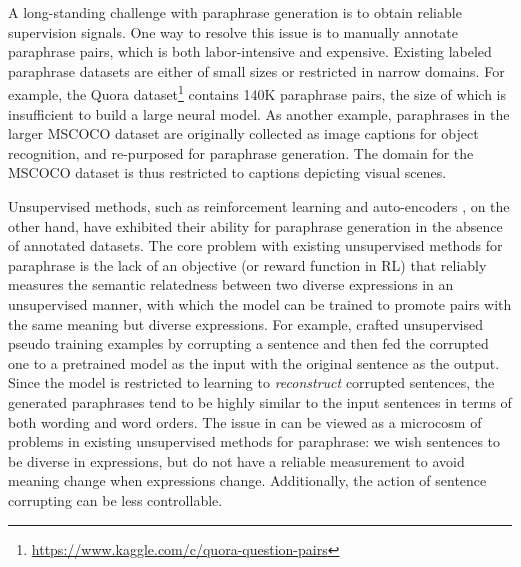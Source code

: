 \documentclass[11pt,a4paper]{article}
\begin{document}
A long-standing challenge with paraphrase generation is to obtain
 reliable supervision signals.
One way to resolve this issue is  to manually annotate paraphrase pairs, which is both labor-intensive and expensive. Existing labeled paraphrase datasets \citep{lin2014microsoft,fader-etal-2013-paraphrase,lan-etal-2017-continuously} are 
either of small sizes or  restricted in narrow domains. 
For example, the Quora dataset\footnote{\url{https://www.kaggle.com/c/quora-question-pairs}}  contains 140K paraphrase pairs, 
the size of 
which is insufficient to build a large neural model. 
As another example,     paraphrases in  the larger  MSCOCO \citep{lin2014microsoft} dataset are originally collected as image captions for object recognition, and re-purposed
 for  paraphrase generation.
 The domain for the MSCOCO dataset is thus 
   restricted to captions  depicting visual scenes. 

 
 

Unsupervised methods, 
such as reinforcement learning \citep{li-etal-2018-paraphrase,Siddique_2020} and 
auto-encoders
 \citep{bowman-etal-2016-generating,roy2019unsupervised}, 
on the other hand, have exhibited their ability for paraphrase generation  in the absence of annotated datasets.  
The core problem with existing unsupervised methods for paraphrase is the lack of an    objective (or reward function in RL) that reliably 
measures the semantic relatedness between two diverse expressions in an unsupervised manner, with which the model can be trained to 
  promote
pairs with the same meaning but diverse expressions. 
For example, 
\citet{hegde2020unsupervised}  crafted unsupervised pseudo training examples by corrupting a sentence and then fed the corrupted one to a pretrained model as the input with the original sentence as the output. 
Since the model is restricted to learning to {\it reconstruct} corrupted sentences, the generated paraphrases tend to be highly similar to the input sentences in terms of both wording and word orders.
The issue in \citet{hegde2020unsupervised}   can be viewed as a microcosm of problems in existing unsupervised methods for paraphrase:
we wish sentences to be diverse in expressions, but do not have a reliable measurement to avoid meaning change when expressions change.  
Additionally, the action of sentence corrupting can be less controllable. 
\end{document}
